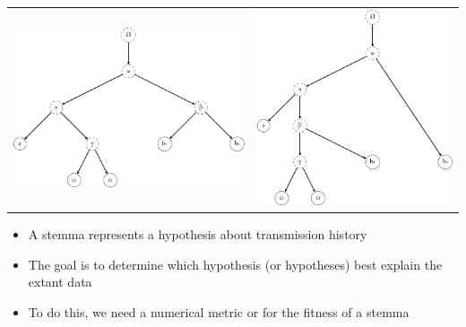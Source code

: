 \documentclass[10pt]{beamer}
\begin{document}
	\begin{frame}
		\begin{tabular}{p{} @{\hskip 0.2\textwidth} p{}}
			\vspace{0pt}\includegraphics[scale=0.4]{../img/gene-tree-rooted-site-1.pdf} & \vspace{0pt}\includegraphics[scale=0.4]{../img/gene-tree-rooted-site-2.pdf}
		\end{tabular}
		\begin{itemize}
			\item A stemma represents a hypothesis about transmission history
			\item The goal is to determine which hypothesis (or hypotheses) best explain the extant data
			\item To do this, we need a numerical metric or  for the fitness of a stemma
		\end{itemize}
	\end{frame}
\end{document}
